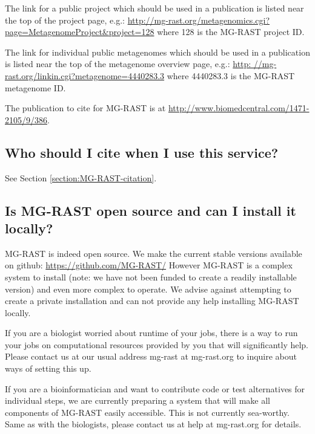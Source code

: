 \documentclass[12pt,fullpage]{report}
\begin{document}
The link for a public project which should be used in a publication is listed near the top of the project page, e.g.:
\url{http://mg-rast.org/metagenomics.cgi?page=MetagenomeProject&project=128}
where 128 is the MG-RAST project ID.

The link for individual public metagenomes which should be used in a publication is listed near the top of the metagenome overview page, e.g.:
\url{http: //mg-rast.org/linkin.cgi?metagenome=4440283.3}
where 4440283.3 is the MG-RAST metagenome ID.

The publication to cite for MG-RAST is at \url{http://www.biomedcentral.com/1471-2105/9/386}.

\subsection*{Who should I cite when I use this service?}
See Section \ref{section:MG-RAST-citation}.
\subsection*{Is MG-RAST open source and can I install it locally?}
MG-RAST is indeed open source. We make the current stable versions available on github: \url{https://github.com/MG-RAST/}
However MG-RAST is a complex system to install (note: we have not been funded to create a readily installable version) and even more complex to operate. We advise against attempting to create a private installation and can not provide any help installing MG-RAST locally.

If you are a biologist worried about runtime of your jobs, there is a way to run your jobs on computational resources provided by you that will significantly help. Please contact us at our usual address mg-rast at mg-rast.org to inquire about ways of setting this up.

If you are a bioinformatician and want to contribute code or test alternatives for individual steps, we are currently preparing a system that will make all components of MG-RAST easily accessible. This is not currently sea-worthy. Same as with the biologists, please contact us at help at mg-rast.org for details.
\end{document}
